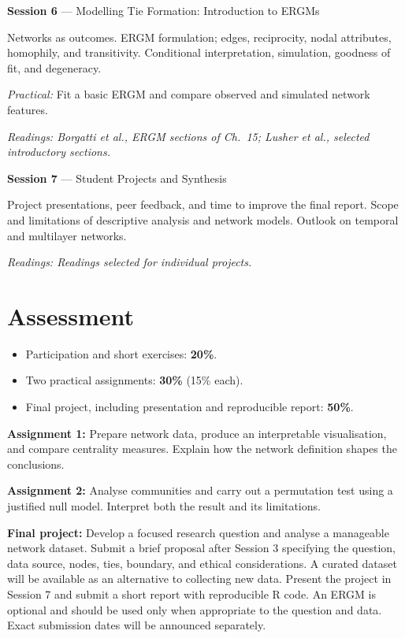 \documentclass[a4paper,11pt]{article}
\newcommand{\session}[4]{\needspace{7\baselineskip}\textbf{Session #1} --- #2\par
\hspace*{1em}\begin{minipage}{\dimexpr\linewidth-1em\relax}#3\par
\textit{Readings: #4}\end{minipage}\par\smallskip}
\begin{document}
\session{6}{Modelling Tie Formation: Introduction to ERGMs}{
Networks as outcomes. ERGM formulation; edges, reciprocity, nodal attributes, homophily, and transitivity. Conditional interpretation, simulation, goodness of fit, and degeneracy.\par
\textit{Practical:} Fit a basic ERGM and compare observed and simulated network features.
}{Borgatti et al., ERGM sections of Ch.~15; Lusher et al., selected introductory sections.}

\session{7}{Student Projects and Synthesis}{
Project presentations, peer feedback, and time to improve the final report. Scope and limitations of descriptive analysis and network models. Outlook on temporal and multilayer networks.
}{Readings selected for individual projects.}

\section*{Assessment}
\begin{itemize}
\item Participation and short exercises: \textbf{20\%}.
\item Two practical assignments: \textbf{30\%} (15\% each).
\item Final project, including presentation and reproducible report: \textbf{50\%}.
\end{itemize}
\textbf{Assignment 1:} Prepare network data, produce an interpretable visualisation, and compare centrality measures. Explain how the network definition shapes the conclusions.

\textbf{Assignment 2:} Analyse communities and carry out a permutation test using a justified null model. Interpret both the result and its limitations.

\textbf{Final project:} Develop a focused research question and analyse a manageable network dataset. Submit a brief proposal after Session 3 specifying the question, data source, nodes, ties, boundary, and ethical considerations. A curated dataset will be available as an alternative to collecting new data. Present the project in Session 7 and submit a short report with reproducible R code. An ERGM is optional and should be used only when appropriate to the question and data. Exact submission dates will be announced separately.
\end{document}
